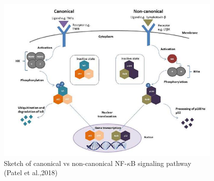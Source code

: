 \documentclass[12pt,a4paper]{report}
\begin{document}
\begin{figure}[!ht]
\hspace*{-1cm} 
\includegraphics[scale=0.70]{canonicalvsnoncanonicalpathway.png}
\caption{Sketch of canonical vs non-canonical NF-$\kappa$B signaling pathway (Patel et al.,2018)}
\label{canonicalvsnoncanonicalpathway}
\end{figure}
\newpage
\end{document}
